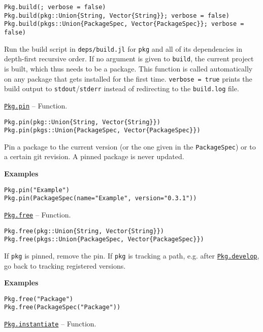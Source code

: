 \begin{adjustwidth}{2em}{0pt}


\begin{verbatim}
Pkg.build(; verbose = false)
Pkg.build(pkg::Union{String, Vector{String}}; verbose = false)
Pkg.build(pkgs::Union{PackageSpec, Vector{PackageSpec}}; verbose = false)
\end{verbatim}

Run the build script in \texttt{deps/build.jl} for \texttt{pkg} and all of its dependencies in depth-first recursive order. If no argument is given to \texttt{build}, the current project is built, which thus needs to be a package. This function is called automatically on any package that gets installed for the first time. \texttt{verbose = true} prints the build output to \texttt{stdout}/\texttt{stderr} instead of redirecting to the \texttt{build.log} file.



\end{adjustwidth}
\hypertarget{9776080518771630101}{} 
\hyperlink{9776080518771630101}{\texttt{Pkg.pin}}  -- {Function.}

\begin{adjustwidth}{2em}{0pt}


\begin{verbatim}
Pkg.pin(pkg::Union{String, Vector{String}})
Pkg.pin(pkgs::Union{PackageSpec, Vector{PackageSpec}})
\end{verbatim}

Pin a package to the current version (or the one given in the \texttt{PackageSpec}) or to a certain git revision. A pinned package is never updated.

\textbf{Examples}


\begin{verbatim}
Pkg.pin("Example")
Pkg.pin(PackageSpec(name="Example", version="0.3.1"))
\end{verbatim}



\end{adjustwidth}
\hypertarget{11960612719163184326}{} 
\hyperlink{11960612719163184326}{\texttt{Pkg.free}}  -- {Function.}

\begin{adjustwidth}{2em}{0pt}


\begin{verbatim}
Pkg.free(pkg::Union{String, Vector{String}})
Pkg.free(pkgs::Union{PackageSpec, Vector{PackageSpec}})
\end{verbatim}

If \texttt{pkg} is pinned, remove the pin. If \texttt{pkg} is tracking a path, e.g. after \hyperlink{9095967362638559586}{\texttt{Pkg.develop}}, go back to tracking registered versions.

\textbf{Examples}


\begin{verbatim}
Pkg.free("Package")
Pkg.free(PackageSpec("Package"))
\end{verbatim}



\end{adjustwidth}
\hypertarget{14292589817666425387}{} 
\hyperlink{14292589817666425387}{\texttt{Pkg.instantiate}}  -- {Function.}

